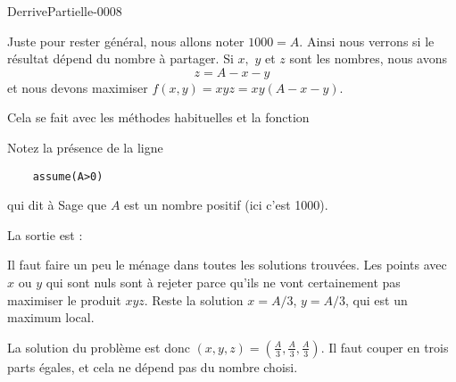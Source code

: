 
\begin{corrige}{DerrivePartielle-0008}

	Juste pour rester général, nous allons noter $1000=A$. Ainsi nous verrons si le résultat dépend du nombre à partager. Si $x,$ $y$ et $z$ sont les nombres, nous avons
	\begin{equation}
		z=A-x-y
	\end{equation}
	et nous devons maximiser $f(x,y)=xyz=xy(A-x-y)$.

	Cela se fait avec les méthodes habituelles et la fonction


	Notez la présence de la ligne
	\begin{verbatim}
	assume(A>0)
	\end{verbatim}
	qui dit à Sage que $A$ est un nombre positif (ici c'est 1000).

	La sortie est :


	Il faut faire un peu le ménage dans toutes les solutions trouvées. Les points avec $x$ ou $y$ qui sont nuls sont à rejeter parce qu'ils ne vont certainement pas maximiser le produit $xyz$. Reste la solution $x=A/3$, $y=A/3$, qui est un maximum local.

	La solution du problème est donc $(x,y,z)=(\frac{ A }{ 3 }, \frac{ A }{ 3 },\frac{ A }{ 3 })$. Il faut couper en trois parts égales, et cela ne dépend pas du nombre choisi.

\end{corrige}
